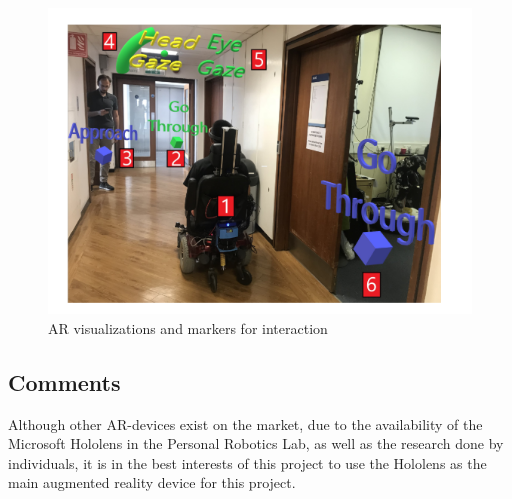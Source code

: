 \begin{figure}[ht]
	\centering
	\includegraphics[width=.5\linewidth]{img/chapter2_background/AR_Interface.png}
	\caption{AR visualizations and markers for interaction \cite{Chacon-Quesada}}
\end{figure}

\subsection{Comments}
Although other AR-devices exist on the market, due to the availability of the Microsoft Hololens in the Personal Robotics Lab, as well as the research done by individuals, it is in the best interests of this project to use the Hololens as the main augmented reality device for this project.
